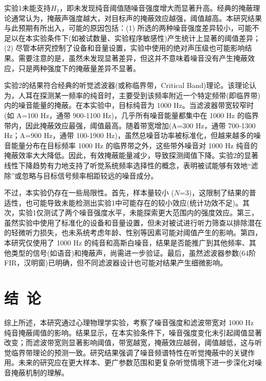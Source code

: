 \documentclass[jou,12pt,floatsintext]{apa7} %
\begin{document}
实验1未能支持\(H_1\)，即未发现纯音阈值随噪音强度增大而显著升高。经典的掩蔽理论通常认为，掩蔽声强度越大，对目标声的掩蔽效应越强，阈值越高\parencite[e.g.][]{small1959pure}。本研究结果与此预期有所出入，可能的原因包括：(1) 所选的两种噪音强度差异较小，可能不足以在本实验条件下(如被试数量、实验程序敏感性)产生统计上显著的阈值差异；(2) 尽管本研究控制了设备和音量设置，实验中使用的绝对声压级也可能影响结果。需要注意的是，虽然未发现显著差异，但这并不意味着噪音没有产生掩蔽效应，只是两种强度下的掩蔽量差异不显著。

实验2的结果符合经典的听觉滤波器(或称临界带，Critical Band)理论\parencite{patterson1976auditory,fletcher1940auditory}。该理论认为，人耳在探测某一频率的纯音时，主要受到该频率附近一个特定频带(即临界带)内的噪音能量的掩蔽。在本实验中，目标纯音为 1000 Hz。当滤波器带宽较窄时(如 A=100 Hz，通带 900-1100 Hz)，几乎所有噪音能量都集中在 1000 Hz 的临界带内，因此掩蔽效应最强，阈值最高。随着带宽增加(A=300 Hz，通带 700-1300 Hz；A=900 Hz，通带 100-1900 Hz)，虽然总噪音功率被标准化，但越来越多的噪音能量分布在目标频率 1000 Hz 的临界带之外，这些带外噪音对 1000 Hz 纯音的掩蔽效率大大降低。因此，有效掩蔽能量减少，导致探测阈值下降。实验2的显著线性下降趋势有力地支持了听觉系统频率选择性的概念，表明被试能够有效地“滤除”或忽略与目标信号频率相距较远的噪音成分。

不过，本实验仍存在一些局限性。首先，样本量较小 (\(N\)=3)，这限制了结果的普适性，也可能导致未能检测出实验1中可能存在的较小效应(统计功效不足)。其次，实验1仅测试了两个噪音强度水平，未能探索更大范围内的强度效应。第三，虽然实验中使用了标准化的设备和音量设置，但未对被试进行听力筛查以排除潜在的轻微听力损失，也未系统考虑年龄、性别等因素可能对阈值产生的影响\parencite{corso1959age,brant1990age}。第四，本研究仅使用了 1000 Hz 的纯音和高斯白噪音，结果是否能推广到其他频率、其他类型的信号(如语音)和掩蔽声，尚需进一步验证。最后，虽然滤波器参数(64阶 FIR，汉明窗)已明确，但不同滤波器设计也可能对结果产生细微影响。

\section{结\ 论}

综上所述，本研究通过心理物理学实验，考察了噪音强度和滤波带宽对 1000 Hz 纯音掩蔽阈值的影响。结果显示，在本实验条件下，噪音强度变化未引起阈值显著改变；而滤波带宽则显著影响阈值，带宽越宽，掩蔽效应越弱，阈值越低，这与听觉临界带理论的预测一致。研究结果强调了噪音频谱特性在听觉掩蔽中的关键作用。未来的研究应在更大样本、更广参数范围和更复杂听觉情境下进一步深化对噪音掩蔽机制的理解。

\printbibliography[title={\heiti 参\ 考\ 文\ 献}]
\end{document}
